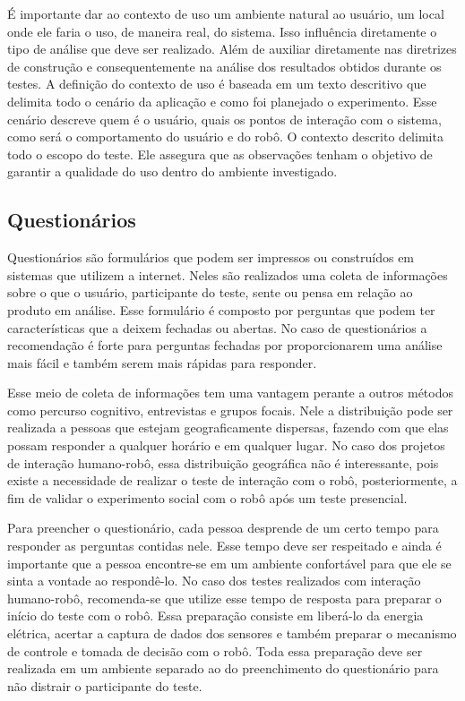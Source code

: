 É importante dar ao contexto de uso um ambiente natural ao usuário, um local onde ele faria o uso, de maneira real, do sistema. Isso influência diretamente o tipo de análise que deve ser realizado. Além de auxiliar diretamente nas diretrizes de construção e consequentemente na análise dos resultados obtidos durante os testes. A definição do contexto de uso é baseada em um texto descritivo que delimita todo o cenário da aplicação e como foi planejado o experimento. Esse cenário descreve quem é o usuário, quais os pontos de interação com o sistema, como será o comportamento do usuário e do robô. O contexto descrito delimita todo o escopo do teste. Ele assegura que as observações tenham o objetivo de garantir a qualidade do uso dentro do ambiente investigado. 

\subsection{Questionários}
\label{sec:questionarios}
Questionários são formulários que podem ser impressos ou construídos em sistemas que utilizem a internet. Neles são realizados uma coleta de informações sobre o que o usuário, participante do teste, sente ou pensa em relação ao produto em análise. Esse formulário é composto por perguntas que podem ter características que a deixem fechadas ou abertas. No caso de questionários a recomendação é forte para perguntas fechadas por proporcionarem uma análise mais fácil e também serem mais rápidas para responder.

Esse meio de coleta de informações tem uma vantagem perante a outros métodos como percurso cognitivo, entrevistas e grupos focais. Nele a distribuição pode ser realizada a pessoas que estejam geograficamente dispersas, fazendo com que elas possam responder a qualquer horário e em qualquer lugar. No caso dos projetos de interação humano-robô, essa distribuição geográfica não é interessante, pois existe a necessidade de realizar o teste de interação com o robô, posteriormente, a fim de validar o experimento social com o robô após um teste presencial.

Para preencher o questionário, cada pessoa desprende de um certo tempo para responder as perguntas contidas nele. Esse tempo deve ser respeitado e ainda é importante que a pessoa encontre-se em um ambiente confortável para que ele se sinta a vontade ao respondê-lo. No caso dos testes realizados com interação humano-robô, recomenda-se que utilize esse tempo de resposta para preparar o início do teste com o robô. Essa preparação consiste em liberá-lo da energia elétrica, acertar a captura de dados dos sensores e também preparar o mecanismo de controle e tomada de decisão com o robô. Toda essa preparação deve ser realizada em um ambiente separado ao do preenchimento do questionário para não distrair o participante do teste.


